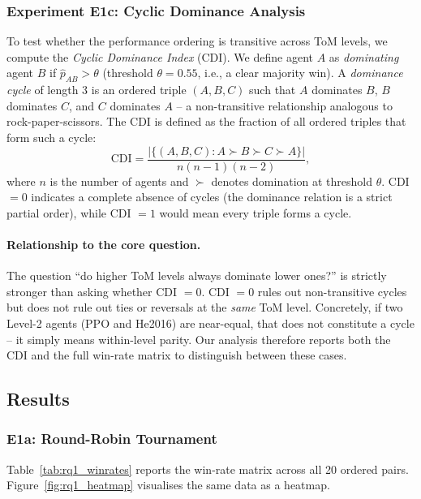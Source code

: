 \documentclass{article}
\begin{document}
  \subsubsection{Experiment E1c: Cyclic Dominance Analysis}

  To test whether the performance ordering is transitive across ToM levels, we
  compute the \emph{Cyclic Dominance Index} (CDI). We define agent $A$ as
  \emph{dominating} agent $B$ if $\hat{p}_{AB} > \theta$ (threshold $\theta =
  0.55$, i.e., a clear majority win). A \emph{dominance cycle} of length 3 is an
  ordered triple $(A, B, C)$ such that $A$ dominates $B$, $B$ dominates $C$, and
  $C$ dominates $A$ -- a non-transitive relationship analogous to rock-paper-scissors.
  The CDI is defined as the fraction of all ordered triples that form such a cycle:
  \[
    \mathrm{CDI} = \frac{|\{(A,B,C) : A \succ B \succ C \succ A\}|}{n(n-1)(n-2)},
  \]
  where $n$ is the number of agents and $\succ$ denotes domination at threshold
  $\theta$. CDI $= 0$ indicates a complete absence of cycles (the dominance
  relation is a strict partial order), while CDI $= 1$ would mean every triple
  forms a cycle.

  \paragraph{Relationship to the core question.} The question ``do higher ToM
  levels always dominate lower ones?'' is strictly stronger than asking whether
  CDI $= 0$. CDI $= 0$ rules out non-transitive cycles but does not rule out ties
  or reversals at the \emph{same} ToM level. Concretely, if two Level-2 agents
  (PPO and He2016) are near-equal, that does not constitute a cycle -- it simply
  means within-level parity. Our analysis therefore reports both the CDI and the
  full win-rate matrix to distinguish between these cases.

  \subsection{Results}

  \subsubsection{E1a: Round-Robin Tournament}

  Table~\ref{tab:rq1_winrates} reports the win-rate matrix across all 20 ordered
  pairs. Figure~\ref{fig:rq1_heatmap} visualises the same data as a heatmap.
\end{document}
